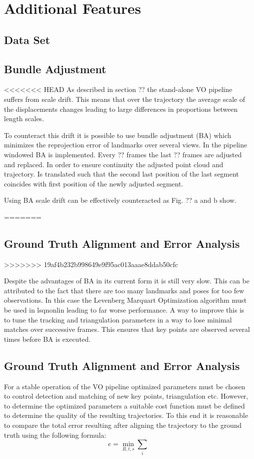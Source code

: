 \chapter{Additional Features}
\section{Data Set}
\label{dataset}

\section{Bundle Adjustment}
<<<<<<< HEAD
As described in section ?? the stand-alone VO pipeline suffers from scale drift. This means that over the trajectory the average scale of the displacements changes leading to large differences in proportions between length scales. \par
To counteract this drift it is possible to use bundle adjustment (BA) which minimizes the reprojection error of landmarks over several views. In the pipeline windowed BA is implemented. Every ?? frames the last ?? frames are adjusted and replaced. In order to ensure continuity the adjusted point cloud and trajectory. Is translated such that the second last position of the last segment coincides with first position of the newly adjusted segment. \par
Using BA scale drift can be effectively counteracted as Fig. ?? a and b show.

=======
\label{bundle adjustment}

\section{Ground Truth Alignment and Error Analysis}
\label{simulation}
>>>>>>> 19af4b232b998649e9f95ac013aaae8ddab50cfc

Despite the advantages of BA in its current form it is still very slow. This can be attributed to the fact that there are too many landmarks and poses for too few observations. In this case the Levenberg Marquart Optimization algorithm must be used in lsqnonlin leading to far worse performance. A way to improve this is to tune the tracking and triangulation parameters in a way to lose minimal matches over successive frames. This ensures that key points are observed several times before BA is executed. 

\section{Ground Truth Alignment and Error Analysis}
For a stable operation of the VO pipeline optimized parameters must be chosen to control detection and matching of new key points, triangulation etc. However, to determine the optimized parameters a suitable cost function must be defined to determine the quality of the resulting trajectories. To this end it is reasonable to compare the total error resulting after aligning the trajectory to the ground truth using the following formula:
$$e = \underset{R,t,s}{\min} \sum_i$$
